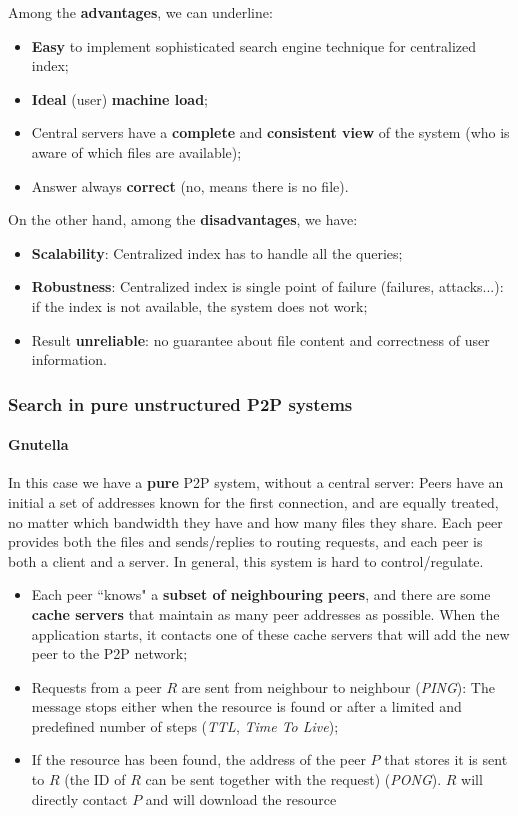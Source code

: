 Among the \textbf{advantages}, we can underline:
\begin{itemize}
    \item \textbf{Easy} to implement sophisticated search engine technique for centralized index;
    \item \textbf{Ideal} (user) \textbf{machine load};
    \item Central servers have a \textbf{complete} and \textbf{consistent view} of the system (who is aware of which files are available);
    \item Answer always \textbf{correct} (no, means there is no file).
\end{itemize}

On the other hand, among the \textbf{disadvantages}, we have:
\begin{itemize}
    \item \textbf{Scalability}: Centralized index has to handle all the queries;
    \item \textbf{Robustness}: Centralized index is single point of failure (failures, attacks...): if the index is not available, the system does not work;
    \item Result \textbf{unreliable}: no guarantee about file content and correctness of user information.
\end{itemize}

\subsubsection{Search in pure unstructured P2P systems}
\paragraph{Gnutella}
In this case we have a \textbf{pure} P2P system, without a central server: Peers have an initial a set of addresses known for the first connection, and are equally treated, no matter which bandwidth they have and how many files they share. Each peer provides both the files and sends/replies to routing requests, and each peer is both a client and a server. In general, this system is hard to control/regulate.

\begin{itemize}
    \item Each peer “knows" a \textbf{subset of neighbouring peers}, and there are some \textbf{cache servers} that maintain as many peer addresses as possible. When the application starts, it contacts one of these cache servers that will add the new peer to the P2P network;
    \item Requests from a peer $R$ are sent from neighbour to neighbour (\textit{PING}): The message stops either when the resource is found or after a limited and predefined number of steps (\textit{TTL}, \textit{Time To Live});
    \item If the resource has been found, the address of the peer $P$ that stores it is sent to $R$ (the ID of $R$ can be sent together with the request) (\textit{PONG}). $R$ will directly contact $P$ and will download the resource
\end{itemize}

